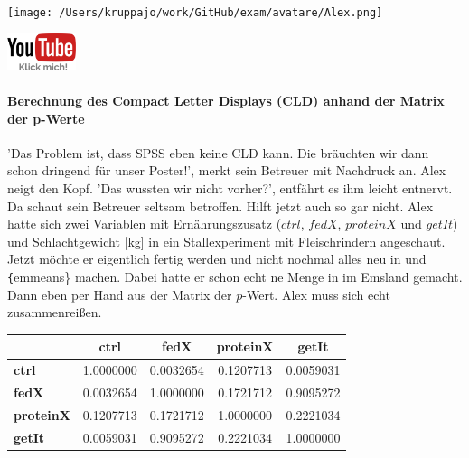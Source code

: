 \documentclass[a4paper, 9pt]{scrartcl}\usepackage[]{graphicx}\usepackage[]{xcolor}
\newenvironment{knitrout}{}{} %
\begin{document}
 
\begin{minipage}[t]{0.5\textwidth}
\texttt{[image: /Users/kruppajo/work/GitHub/exam/avatare/Alex.png]}
\end{minipage}
\begin{minipage}[t]{0.5\textwidth}
\hfill
\href{https://youtu.be/RagTFFKFbFg}{\includegraphics[width = 2cm]{img/youtube}}
\end{minipage}
\vspace{-3ex}



\paragraph{Berechnung des Compact Letter Displays (CLD) anhand der Matrix der p-Werte}

'Das Problem ist, dass SPSS eben keine CLD kann. Die bräuchten wir dann schon dringend für unser Poster!', merkt sein Betreuer mit Nachdruck an. Alex neigt den Kopf. 'Das wussten wir nicht vorher?', entfährt es ihm leicht entnervt. Da schaut sein Betreuer seltsam betroffen. Hilft jetzt auch so gar nicht. Alex hatte sich zwei Variablen mit Ernährungszusatz ($ctrl$, $fedX$, $proteinX$ und $getIt$) und Schlachtgewicht [kg] in ein Stallexperiment mit Fleischrindern angeschaut. Jetzt möchte er eigentlich fertig werden und nicht nochmal alles neu in \Rlogo und \texttt\{emmeans\} machen. Dabei hatte er schon echt ne Menge in im Emsland gemacht. Dann eben per Hand aus der Matrix der $p$-Wert. Alex muss sich echt zusammenreißen.

\begin{knitrout}
\color{fgcolor}\begin{table}[!h]
\centering\begingroup\fontsize{10}{12}\selectfont

\begin{tabular}{>{}lcccc}
\toprule
\textbf{ } & \textbf{ctrl} & \textbf{fedX} & \textbf{proteinX} & \textbf{getIt}\\
\midrule
\textbf{ctrl} & 1.0000000 & 0.0032654 & 0.1207713 & 0.0059031\\
\textbf{fedX} & 0.0032654 & 1.0000000 & 0.1721712 & 0.9095272\\
\textbf{proteinX} & 0.1207713 & 0.1721712 & 1.0000000 & 0.2221034\\
\textbf{getIt} & 0.0059031 & 0.9095272 & 0.2221034 & 1.0000000\\
\bottomrule
\end{tabular}
\endgroup{}
\end{table}

\end{knitrout}
\end{document}
